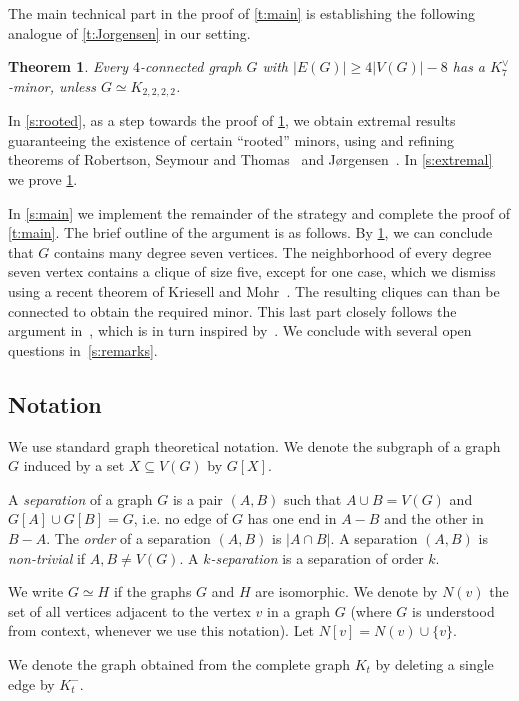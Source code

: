 \documentclass[reqno,final,12pt]{amsart}
\newtheorem{thm}{Theorem}
\begin{document}
	The main technical part in the proof of \cref{t:main} is establishing the following analogue of \cref{t:Jorgensen} in our setting. 		
	
	\begin{thm}\label{t:extremal}
		Every $4$-connected graph $G$ with $|E(G)| \geq 4|V(G)| - 8$ has a $K_7^{\vee}$-minor, unless $G \simeq K_{2,2,2,2}$.
	\end{thm}
	
In \cref{s:rooted}, as a step towards the proof of \cref{t:extremal}, we obtain extremal results guaranteeing the existence of certain ``rooted'' minors, using and refining theorems of Robertson, Seymour and Thomas~\cite{RST1993} and J{\o}rgensen~\cite{Jorgensen1994}.  In \cref{s:extremal} we prove \cref{t:extremal}.

In \cref{s:main} we implement the remainder of the strategy and complete the proof of \cref{t:main}. The brief outline of the argument is as follows.  By \cref{t:extremal}, we can conclude that $G$ contains many degree seven vertices. The neighborhood of every degree seven vertex contains a clique of size five, except for one case, which we dismiss using a recent theorem of Kriesell and Mohr~\cite{KM2019}. The resulting cliques can than be connected to obtain the required minor. This last part closely follows the argument in~\cite{KT2005}, which is in turn inspired by~\cite{RST1993}.  We conclude with several open questions in~\cref{s:remarks}.

 

\subsection*{Notation} We use standard graph theoretical notation. We denote the subgraph of a graph $G$ induced by a set $X \subseteq V(G)$ by $G[X]$. 

A \emph{separation} of a graph $G$ is a pair $(A,B)$  such that $A \cup B = V(G)$ and $G[A] \cup G[B]= G$, i.e. no edge of $G$ has one end in $A-B$ and the other in $B-A$. The \emph{order} of a separation $(A,B)$ is $|A \cap B|$. A separation $(A,B)$ is \emph{non-trivial} if $A,B \neq V(G)$.  A \emph{$k$-separation} is a separation
of order $k$.

We write $G \simeq H$ if the graphs $G$ and $H$ are isomorphic. We denote by $N(v)$ the set of all vertices adjacent to the vertex $v$ in a graph $G$ (where $G$ is understood from context, whenever we use this notation). Let $N[v]= N(v) \cup \{v\}$.

We denote the graph obtained from the complete graph $K_t$ by deleting a single edge by $K^-_t$.
	
\end{document}
